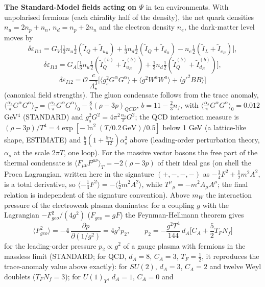 \documentclass[
  10pt,
]{article}
\begin{document}
\textbf{The Standard-Model fields acting on \(\Psi\)} in ten
environments. With unpolarised fermions (each chirality half of the
density), the net quark densities \(n_u = 2n_p + n_n\),
\(n_d = n_p + 2n_n\) and the electron density \(n_e\), the dark-matter
level moves by
\[ \delta\varepsilon_{I11} = G_V\Big[\tfrac13n_u\tfrac12(\tilde I_Q + \tilde I_{u_R}) + \tfrac13n_d\tfrac12(\tilde I_Q + \tilde I_{d_R}) - n_e\tfrac12(\tilde I_L + \tilde I_{e_R})\Big],\]
\[ \delta\varepsilon_{I13} = G_A\Big[\tfrac13n_u\tfrac12(\tilde I^{(b)}_Q + \tilde I^{(b)}_{u_R}) + \tfrac13n_d\tfrac12(\tilde I^{(b)}_Q + \tilde I^{(b)}_{d_R})\Big], \]
\[ \delta\varepsilon_{I12} = \mathcal O\,\frac{c}{\Lambda_\star^3}\Big[\langle g_s^2G^\alpha G^\alpha\rangle + \langle g^2W^aW^a\rangle + \langle g'^2BB\rangle\Big] \]
(canonical field strengths). The gluon condensate follows from the trace
anomaly,
\(\langle\frac{\alpha_s}{\pi}G^\alpha G^\alpha\rangle_T = \langle\frac{\alpha_s}{\pi}G^\alpha G^\alpha\rangle_0 - \frac{8}{b}(\rho - 3p)_{QCD}\),
\(b = 11 - \frac23n_f\), with
\(\langle\frac{\alpha_s}{\pi}G^\alpha G^\alpha\rangle_0 = 0.012\)
GeV\(^4\) (STANDARD) and \(g_s^2G^2 = 4\pi^2\frac{\alpha_s}{\pi}G^2\);
the QCD interaction measure is
\((\rho - 3p)/T^4 = 4\exp[-\ln^2(T/0.2\,\text{GeV})/0.5]\) below 1 GeV
(a lattice-like shape, ESTIMATE) and
\(\frac{b}{3}(1 + \frac{5n_f}{12})\alpha_s^2\) above (leading-order
perturbation theory, \(\alpha_s\) at the scale \(2\pi T\), one loop).
For the massive vector bosons the free part of the thermal condensate is
\(\langle F_{\mu\nu}F^{\mu\nu}\rangle_T = -2(\rho - 3p)\) of their ideal
gas (on shell the Proca Lagrangian, written here in the signature
\((+,-,-,-)\) as \(-\frac14F^2 + \frac12m^2A^2\), is a total derivative,
so \(\langle -\frac14F^2\rangle = -\langle\frac12m^2A^2\rangle\), while
\(T^\mu{}_\mu = -m^2A_\mu A^\mu\); the final relation is independent of
the signature convention). Above \(m_W\) the interaction pressure of the
electroweak plasma dominates: for a coupling \(g\) with the Lagrangian
\(-F_{geo}^2/(4g^2)\) (\(F_{geo} = gF\)) the Feynman-Hellmann theorem
gives
\[ \langle F_{geo}^2\rangle = -4\,\frac{\partial p}{\partial(1/g^2)} = 4g^2p_2,\qquad p_2 = -\frac{g^2T^4}{144}\,d_A\Big[C_A + \frac52T_FN_f\Big] \]
for the leading-order pressure \(p_2 \propto g^2\) of a gauge plasma
with fermions in the massless limit (STANDARD; for QCD, \(d_A = 8\),
\(C_A = 3\), \(T_F = \frac12\), it reproduces the trace-anomaly value
above exactly): for \(SU(2)\), \(d_A = 3\), \(C_A = 2\) and twelve Weyl
doublets (\(T_FN_f = 3\)); for \(U(1)_Y\), \(d_A = 1\), \(C_A = 0\) and
\end{document}
